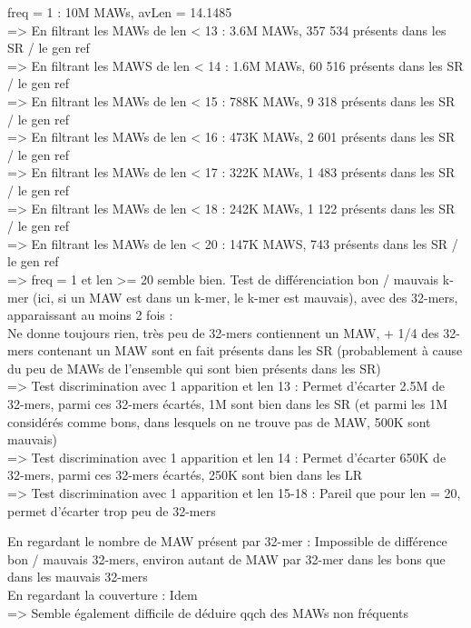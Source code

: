 \documentclass[12pt]{article}
\begin{document}
freq = 1 : 10M MAWs, avLen = 14.1485 \\
=> En filtrant les MAWs de len < 13 : 3.6M MAWs, 357 534 présents dans les SR / le gen ref \\
=> En filtrant les MAWS de len < 14 : 1.6M MAWs, 60 516 présents dans les SR / le gen ref \\
=> En filtrant les MAWs de len < 15 : 788K MAWs, 9 318 présents dans les SR / le gen ref \\
=> En filtrant les MAWs de len < 16 : 473K MAWs, 2 601 présents dans les SR / le gen ref \\
=> En filtrant les MAWs de len < 17 : 322K MAWs, 1 483 présents dans les SR / le gen ref \\
=> En filtrant les MAWs de len < 18 : 242K MAWs, 1 122 présents dans les SR / le gen ref \\
=> En filtrant les MAWs de len < 20 : 147K MAWS, 743 présents dans les SR / le gen ref \\

=> freq = 1 et len >= 20 semble bien. Test de différenciation bon / mauvais k-mer (ici, si un MAW est dans un k-mer, le k-mer est mauvais), avec des 32-mers,
apparaissant au moins 2 fois : \\

Ne donne toujours rien, très peu de 32-mers contiennent un MAW, + 1/4 des 32-mers contenant un MAW sont en fait présents dans les SR (probablement à cause du peu
de MAWs de l'ensemble qui sont bien présents dans les SR) \\
=> Test discrimination avec 1 apparition et len 13 : Permet d'écarter 2.5M de 32-mers, parmi ces 32-mers écartés, 1M sont bien dans les SR (et parmi les 1M considérés comme bons, dans lesquels on ne trouve pas de MAW, 500K sont mauvais) \\
=> Test discrimination avec 1 apparition et len 14 : Permet d'écarter 650K de 32-mers, parmi ces 32-mers écartés, 250K sont bien dans les LR \\
=> Test discrimination avec 1 apparition et len 15-18 : Pareil que pour len = 20, permet d'écarter trop peu de 32-mers

En regardant le nombre de MAW présent par 32-mer : Impossible de différence bon / mauvais 32-mers, environ autant de MAW par 32-mer dans les bons
que dans les mauvais 32-mers \\

En regardant la couverture : Idem \\

=> Semble également difficile de déduire qqch des MAWs non fréquents
\end{document}
